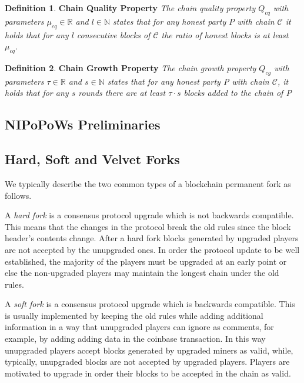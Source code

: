 \documentclass[10pt,a4paper]{article}
\theoremstyle{plain}
\theoremstyle{definition}
\newtheorem{defn}{Definition}
\theoremstyle{lemma}
\theoremstyle{corollary}
\begin{document}
\begin{defn}{\textbf{Chain Quality Property}}
	\textit{The chain quality property $Q_{cq}$ with parameters $\mu_{cq} \in \mathbb{R}$ and $l \in \mathbb{N}$ states that for any honest party $P$ with chain $\mathcal{C}$ it holds that for any $l $ consecutive blocks of $\mathcal{C}$ the ratio of honest blocks is at least $\mu_{cq}$.}
	\label{defn:chain_quality}
\end{defn}

\begin{defn}{\textbf{Chain Growth Property}}
	\textit{The chain growth property $Q_{cg}$ with
parameters $\tau \in \mathbb{R}$ and $s \in \mathbb{N}$ states that for any honest party
\textit{P} with chain $\mathcal{C}$, it holds that for any $s$ rounds there are at least 
$\tau \cdot s$ blocks added to the chain of \textit{P}}
	\label{defn:chain_growth}
\end{defn}

\subsection{NIPoPoWs Preliminaries}

\subsection{Hard, Soft and Velvet Forks}
We typically describe the two common types of a blockchain permanent fork as follows.

A \textit{hard fork} is a consensus protocol upgrade which is not backwards
compatible. This means that the changes in the protocol break the old rules
since the block header's contents change. After a hard fork blocks generated
by upgraded players are not accepted by the unupgraded ones. In order the
protocol update to be well established, the majority of the players must be
upgraded at an early point or else the non-upgraded players may maintain the
longest chain under the old rules.

A \textit{soft fork} is a consensus protocol upgrade which is backwards compatible.
This is usually implemented by keeping the old rules while adding additional
information in a way that unupgraded players can ignore as comments, for example,
by adding adding data in the coinbase transaction. In this way unupgraded players
accept blocks generated by upgraded miners as valid, while, typically, unupgraded
blocks are not accepted by upgraded players. Players are motivated to upgrade in
order their blocks to be accepted in the chain as valid.
\end{document}
